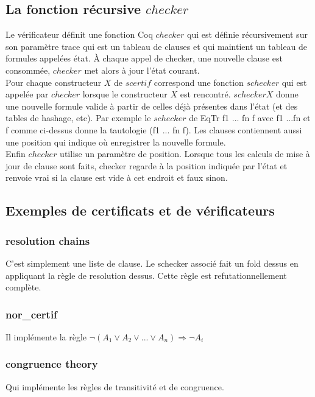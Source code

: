 \documentclass[11pt]{article}
\begin{document}
\subsection{La fonction récursive $checker$} 
Le vérificateur définit une fonction Coq $checker$ qui est définie récursivement sur son paramètre trace qui est un tableau de clauses et qui maintient un tableau de formules appelées état. À chaque appel de checker, une nouvelle clause est consommée, $checker$ met alors à jour l'état courant.\\

Pour chaque constructeur $X$ de $scertif$ correspond une fonction $schecker$ qui est appelée par $checker$ lorsque le constructeur $X$ est rencontré. $schecker X$ donne une nouvelle formule valide à partir de celles déjà présentes dans l'état (et des tables de hashage, etc). Par exemple le $schecker$ de EqTr f1 ... fn f avec f1 ...fn et f comme ci-dessus donne la tautologie (f1 \/ ... \/ fn \/ f). Les clauses contiennent aussi une position qui indique où enregistrer la nouvelle formule.\\

Enfin $checker$ utilise un paramètre de position. Lorsque tous les calculs de mise à jour de clause sont faits, checker regarde à la position indiquée par l'état et renvoie vrai si la clause est vide à cet endroit et faux sinon.

\subsection{Exemples de certificats et de vérificateurs}
\subsubsection{resolution chains}
C'est simplement une liste de clause.
Le schecker associé fait un fold dessus en appliquant la règle de resolution dessus. Cette règle est refutationnellement complète.

\subsubsection{nor\_certif}
Il implémente la règle $\neg (A_1 \vee A_2 \vee ... \vee A_n) \Rightarrow \neg A_i$

\subsubsection{congruence theory}
Qui implémente les règles de transitivité et de congruence.
\end{document}
